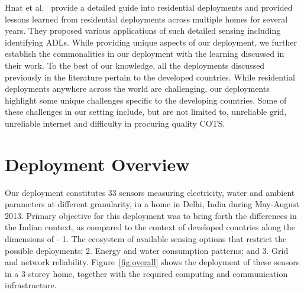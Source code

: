 \documentclass[10pt]{sensys-proc}
\newcommand{\figref}[1]{Figure~\ref{#1}}
\begin{document}
 Hnat et al.~\cite{hitchhiker_residential} provide a detailed guide into residential deployments and provided lessons learned from residential deployments across multiple homes for several years. They proposed various applications of such detailed sensing including identifying ADLs. While providing unique aspects of our deployment, we further establish the commonalities in our deployment with the learning discussed in their work. %
To the best of our knowledge, all the deployments discussed previously in the literature pertain to the developed countries. While residential deployments anywhere across the world are challenging, our deployments highlight some unique challenges specific to the developing countries. Some of these challenges in our setting include, but are not limited to, unreliable grid, unreliable internet and difficulty in procuring quality COTS.

\vspace{-1mm}
\section{Deployment Overview}
Our deployment constitutes 33 sensors measuring electricity, water and ambient parameters at different granularity, in a home in Delhi, India during May-August 2013. Primary objective for this deployment was to bring forth the differences in the Indian context, as compared to the context of developed countries along the dimensions of - 1. The ecosystem of available sensing options that restrict the possible deployments; 2. Energy and water consumption patterns; and 3. Grid and network reliability. \figref{fig:overall} shows the deployment of these sensors in a 3 storey home, together with the required computing and communication infrastructure. %
\end{document}
